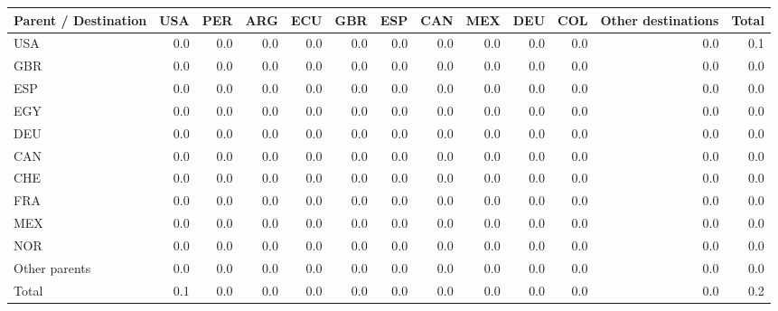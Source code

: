 \begin{tabular}{lrrrrrrrrrrrr}
\toprule
Parent / Destination & USA & PER & ARG & ECU & GBR & ESP & CAN & MEX & DEU & COL & Other destinations & Total \\
\midrule
USA & 0.0 & 0.0 & 0.0 & 0.0 & 0.0 & 0.0 & 0.0 & 0.0 & 0.0 & 0.0 & 0.0 & 0.1 \\
GBR & 0.0 & 0.0 & 0.0 & 0.0 & 0.0 & 0.0 & 0.0 & 0.0 & 0.0 & 0.0 & 0.0 & 0.0 \\
ESP & 0.0 & 0.0 & 0.0 & 0.0 & 0.0 & 0.0 & 0.0 & 0.0 & 0.0 & 0.0 & 0.0 & 0.0 \\
EGY & 0.0 & 0.0 & 0.0 & 0.0 & 0.0 & 0.0 & 0.0 & 0.0 & 0.0 & 0.0 & 0.0 & 0.0 \\
DEU & 0.0 & 0.0 & 0.0 & 0.0 & 0.0 & 0.0 & 0.0 & 0.0 & 0.0 & 0.0 & 0.0 & 0.0 \\
CAN & 0.0 & 0.0 & 0.0 & 0.0 & 0.0 & 0.0 & 0.0 & 0.0 & 0.0 & 0.0 & 0.0 & 0.0 \\
CHE & 0.0 & 0.0 & 0.0 & 0.0 & 0.0 & 0.0 & 0.0 & 0.0 & 0.0 & 0.0 & 0.0 & 0.0 \\
FRA & 0.0 & 0.0 & 0.0 & 0.0 & 0.0 & 0.0 & 0.0 & 0.0 & 0.0 & 0.0 & 0.0 & 0.0 \\
MEX & 0.0 & 0.0 & 0.0 & 0.0 & 0.0 & 0.0 & 0.0 & 0.0 & 0.0 & 0.0 & 0.0 & 0.0 \\
NOR & 0.0 & 0.0 & 0.0 & 0.0 & 0.0 & 0.0 & 0.0 & 0.0 & 0.0 & 0.0 & 0.0 & 0.0 \\
Other parents & 0.0 & 0.0 & 0.0 & 0.0 & 0.0 & 0.0 & 0.0 & 0.0 & 0.0 & 0.0 & 0.0 & 0.0 \\
\midrule
Total & 0.1 & 0.0 & 0.0 & 0.0 & 0.0 & 0.0 & 0.0 & 0.0 & 0.0 & 0.0 & 0.0 & 0.2 \\
\bottomrule
\end{tabular}
